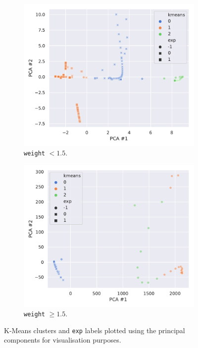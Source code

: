 \begin{figure}[htbp]
  \centering
  \begin{subfigure}{0.45\textwidth}
    \centering
    \includegraphics[width=\linewidth]{img/kmeans_low}
    \caption{\texttt{weight} $< 1.5$.}
  \end{subfigure}
  \begin{subfigure}{0.45\textwidth}
    \centering
    \includegraphics[width=\linewidth]{img/kmeans_high}
    \caption{\texttt{weight} $\ge 1.5$.}
  \end{subfigure}
  \caption{K-Means clusters and \texttt{exp} labels plotted using the principal
  components for visualisation purposes.}
  \label{fig:lumps:kmeans}
\end{figure}

